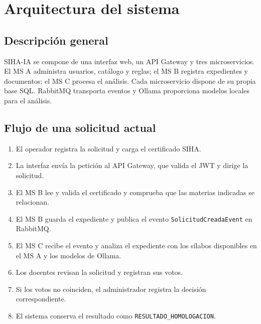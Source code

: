 \section{Arquitectura del sistema}
\subsection{Descripción general}
SIHA-IA se compone de una interfaz web, un API Gateway y tres microservicios. El MS A administra usuarios, catálogo y reglas; el MS B registra expedientes y documentos; el MS C procesa el análisis. Cada microservicio dispone de su propia base SQL. RabbitMQ transporta eventos y Ollama proporciona modelos locales para el análisis.

\subsection{Flujo de una solicitud actual}
\begin{enumerate}
\item El operador registra la solicitud y carga el certificado SIHA.
\item La interfaz envía la petición al API Gateway, que valida el JWT y dirige la solicitud.
\item El MS B lee y valida el certificado y comprueba que las materias indicadas se relacionan.
\item El MS B guarda el expediente y publica el evento \texttt{SolicitudCreadaEvent} en RabbitMQ.
\item El MS C recibe el evento y analiza el expediente con los sílabos disponibles en el MS A y los modelos de Ollama.
\item Los docentes revisan la solicitud y registran sus votos.
\item Si los votos no coinciden, el administrador registra la decisión correspondiente.
\item El sistema conserva el resultado como \texttt{RESULTADO\_HOMOLOGACION}.
\end{enumerate}

